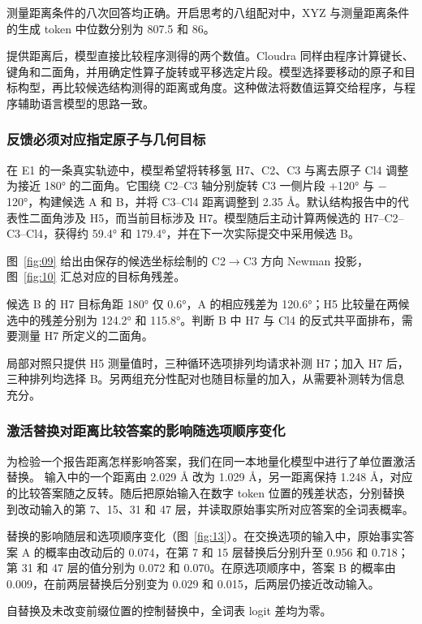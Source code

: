 测量距离条件的八次回答均正确。开启思考的八组配对中，XYZ 与测量距离条件的生成 token 中位数分别为 807.5 和 86。

提供距离后，模型直接比较程序测得的两个数值。Cloudra 同样由程序计算键长、键角和二面角，并用确定性算子旋转或平移选定片段。模型选择要移动的原子和目标构型，再比较候选结构测得的距离或角度。这种做法将数值运算交给程序，与程序辅助语言模型的思路一致。\citep{ref15}

\subsubsection{反馈必须对应指定原子与几何目标}

在 E1 的一条真实轨迹中，模型希望将转移氢 H7、C2、C3 与离去原子 Cl4 调整为接近 180° 的二面角。它围绕 C2–C3 轴分别旋转 C3 一侧片段 +120° 与 \( - \)120°，构建候选 A 和 B，并将 C3–Cl4 距离调整到 2.35 Å。默认结构报告中的代表性二面角涉及 H5，而当前目标涉及 H7。模型随后主动计算两候选的 H7–C2–C3–Cl4，获得约 59.4° 和 179.4°，并在下一次实际提交中采用候选 B。

图~\ref{fig:09} 给出由保存的候选坐标绘制的 C2\(\to\)C3 方向 Newman 投影，图~\ref{fig:10} 汇总对应的目标角残差。

候选 B 的 H7 目标角距 180° 仅 0.6°，A 的相应残差为 120.6°；H5 比较量在两候选中的残差分别为 124.2° 和 115.8°。判断 B 中 H7 与 Cl4 的反式共平面排布，需要测量 H7 所定义的二面角。

局部对照只提供 H5 测量值时，三种循环选项排列均请求补测 H7；加入 H7 后，三种排列均选择 B。另两组充分性配对也随目标量的加入，从需要补测转为信息充分。

\subsubsection{激活替换对距离比较答案的影响随选项顺序变化}

为检验一个报告距离怎样影响答案，我们在同一本地量化模型中进行了单位置激活替换。\citep{ref16} 输入中的一个距离由 2.029 Å 改为 1.029 Å，另一距离保持 1.248 Å，对应的比较答案随之反转。随后把原始输入在数字 token 位置的残差状态，分别替换到改动输入的第 7、15、31 和 47 层，并读取原始事实所对应答案的全词表概率。

替换的影响随层和选项顺序变化（图~\ref{fig:13}）。在交换选项的输入中，原始事实答案 A 的概率由改动后的 0.074，在第 7 和 15 层替换后分别升至 0.956 和 0.718；第 31 和 47 层的值分别为 0.072 和 0.070。在原选项顺序中，答案 B 的概率由 0.009，在前两层替换后分别变为 0.029 和 0.015，后两层仍接近改动输入。

自替换及未改变前缀位置的控制替换中，全词表 logit 差均为零。

